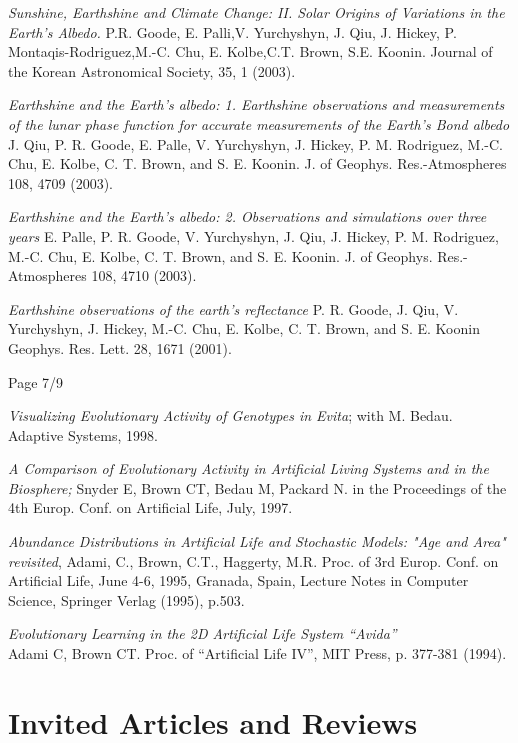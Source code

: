 \documentclass[margin,line]{resume}
\begin{document}
\begin{resume}
{\em Sunshine, Earthshine and Climate Change: II. Solar Origins of Variations in the Earth's Albedo.}  P.R. Goode, E. Palli,V. Yurchyshyn, J. Qiu,
 J. Hickey, P. Montaqis-Rodriguez,M.-C. Chu,
 E. Kolbe,C.T. Brown, S.E. Koonin.
Journal of the Korean Astronomical Society, 35, 1 (2003).

{\em Earthshine and the Earth's albedo: 1. Earthshine observations and measurements of the lunar phase function for accurate measurements of the Earth's Bond albedo}
J. Qiu, P. R. Goode, E. Palle, V. Yurchyshyn, J. Hickey, P. M. Rodriguez, M.-C. Chu, E. Kolbe, C. T. Brown, and S. E. Koonin.
J. of Geophys. Res.-Atmospheres 108, 4709 (2003).

{\em Earthshine and the Earth's albedo: 2. Observations and simulations over three years}
 E. Palle, P. R. Goode, V. Yurchyshyn, J. Qiu, J. Hickey, P. M. Rodriguez, M.-C. Chu, E. Kolbe, C. T. Brown, and S. E. Koonin.
J. of Geophys. Res.-Atmospheres 108, 4710 (2003).


{\em Earthshine observations of the earth's reflectance}
P. R. Goode, J. Qiu, V. Yurchyshyn, J. Hickey, M.-C. Chu, E. Kolbe, C. T. Brown, and S. E. Koonin
Geophys. Res. Lett. 28, 1671 (2001).

\vspace{1cm}
{\centerline {Page 7/9}}

\newpage

{\em Visualizing Evolutionary Activity of Genotypes in Evita};
with M. Bedau.  Adaptive Systems, 1998.

{\em A Comparison of Evolutionary Activity in Artificial Living Systems and in the 
	Biosphere;} Snyder E, Brown CT, Bedau M, Packard N.
in the Proceedings of the 4th Europ. Conf. on 
Artificial Life, July, 1997.

{\em Abundance Distributions in Artificial Life and Stochastic Models: "Age and
Area" revisited}, Adami, C., Brown, C.T., Haggerty, M.R.
Proc. of 3rd Europ. Conf. on Artificial Life, June 4-6, 1995,
Granada, Spain, Lecture Notes in Computer Science, Springer Verlag (1995),
p.503.

{\em Evolutionary Learning in the 2D Artificial Life System ``Avida''}\\
Adami C, Brown CT. Proc. of ``Artificial Life IV'', MIT Press, p. 377-381
(1994).

\section{\mysidestyle Invited Articles and Reviews}


\end{resume}
\end{document}

